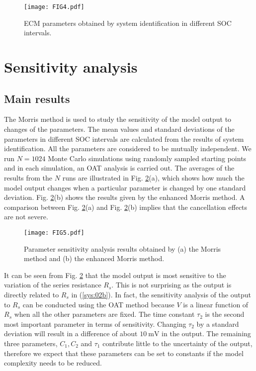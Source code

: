 \documentclass[letterpaper,twocolumn]{IEEEtran}
\begin{document}
\begin{figure}
\centering
\texttt{[image: FIG4.pdf]}
\caption{ECM parameters obtained by system identification in different SOC intervals.}
\label{fig:Figure4}
\end{figure}


\section{Sensitivity analysis}


\subsection{Main results}
The Morris method is used to study the sensitivity of the model output to changes of the parameters. The mean values and standard deviations of the parameters in different SOC intervals are calculated from the results of system identification. All the parameters are considered to be mutually independent. We run $N=1024$ Monte Carlo simulations using randomly sampled starting points and in each simulation, an OAT analysis is carried out. The averages of the results from the $N$ runs are illustrated in Fig. \ref{fig:Figure5}(a), which shows how much the model output changes when a particular parameter is changed by one standard deviation. Fig. \ref{fig:Figure5}(b) shows the results given by the enhanced Morris method. A comparison between Fig. \ref{fig:Figure5}(a) and Fig. \ref{fig:Figure5}(b) implies that the cancellation effects are not severe.
\begin{figure}
\centering
\texttt{[image: FIG5.pdf]}
\caption{Parameter sensitivity analysis results obtained by (a) the Morris method and (b) the enhanced Morris method. }
\label{fig:Figure5}
\end{figure}

It can be seen from Fig. \ref{fig:Figure5} that the model output is most sensitive to the variation of the series resistance $R_s$. This is not surprising as the output is directly related to $R_s$ in (\ref{sys:02b}). In fact, the sensitivity analysis of the output to $R_s$ can be conducted using the OAT method because $V$ is a linear function of $R_s$ when all the other parameters are fixed. The time constant $\tau_2$ is the second most important parameter in terms of sensitivity. Changing $\tau_2$ by a standard deviation will result in a difference of about $\SI{10} {\milli\volt}$  in the output. The remaining three parameters, $C_1, C_2$ and $\tau_1$ contribute little to the uncertainty of the output, therefore we expect that these parameters can be set to constants if the model complexity needs to be reduced.
\end{document}
